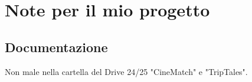 
\chapter{Note per il mio progetto}
\section{Documentazione}
\par Non male nella cartella del Drive 24/25 "CineMatch" e "TripTales".

